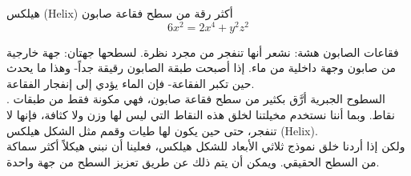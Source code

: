 \begin{surferPage}[هيلكس]{هيلكس (Helix)}
أكثر رقة من سطح فقاعة صابون\\
  \smallskip
\[6x^2	= 2x^4	+ y^2	z^2\]

\singlespacing
فقاعات الصابون هشة: نشعر أنها تنفجر من مجرد نظرة. لسطحها جهتان: جهة خارجية من صابون وجهة داخلية من ماء. إذا أصبحت طبقة الصابون رقيقة جداً- وهذا ما يحدث حين تكبر الفقاعة- فإن الماء يؤدي إلى إنفجار الفقاعة.\\
\vspace{0,3cm}.
السطوح الجبرية أرَّق بكثير من سطح فقاعة صابون، فهي مكونة فقط من طبقات نقاط. وبما أننا نستخدم مخيلتنا لخلق هذه النقاط التي ليس لها وزن ولا كثافة، فإنها لا تنفجر، حتى حين يكون لها طيات وقمم مثل الشكل هيلكس \textenglish{(Helix)}.\\
\vspace{0,3cm}
ولكن إذا أردنا خلق نموذج ثلاثي الأبعاد للشكل هيلكس، فعلينا أن نبني هيكلاً أكثر سماكة من السطح الحقيقي. ويمكن أن يتم ذلك عن طريق تعزيز السطح من جهة واحدة.
\end{surferPage}
